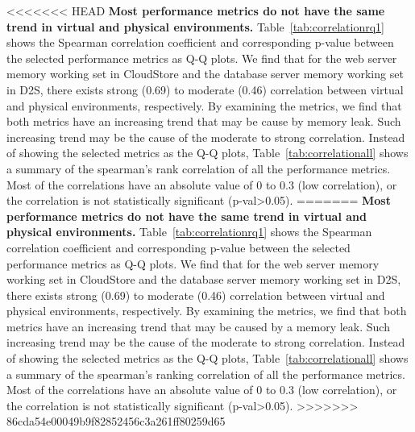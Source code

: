 <<<<<<< HEAD
\textbf{Most performance metrics do not have the same trend in virtual and physical environments.} Table~\ref{tab:correlationrq1} shows the Spearman correlation coefficient and corresponding p-value between the selected performance metrics as Q-Q plots. We find that for the web server memory working set in CloudStore and the database server memory working set in D2S, there exists strong (0.69) to moderate (0.46) correlation between virtual and physical environments, respectively. By examining the metrics, we find that both metrics have an increasing trend that may be cause by memory leak. Such increasing trend may be the cause of the moderate to strong correlation. Instead of showing the selected metrics as the Q-Q plots, Table~\ref{tab:correlationall} shows a summary of the spearman's rank correlation of all the performance metrics. Most of the correlations have an absolute value of 0 to 0.3 (low correlation), or the correlation is not statistically significant (p-val\textgreater0.05).
=======
\textbf{Most performance metrics do not have the same trend in virtual and physical environments.} Table~\ref{tab:correlationrq1} shows the Spearman correlation coefficient and corresponding p-value between the selected performance metrics as Q-Q plots. We find that for the web server memory working set in CloudStore and the database server memory working set in D2S, there exists strong (0.69) to moderate (0.46) correlation between virtual and physical environments, respectively. By examining the metrics, we find that both metrics have an increasing trend that may be caused by a memory leak. Such increasing trend may be the cause of the moderate to strong correlation. Instead of showing the selected metrics as the Q-Q plots, Table~\ref{tab:correlationall} shows a summary of the spearman's ranking correlation of all the performance metrics. Most of the correlations have an absolute value of 0 to 0.3 (low correlation), or the correlation is not statistically significant (p-val\textgreater0.05).
>>>>>>> 86cda54e00049b9f82852456c3a261ff80259d65




